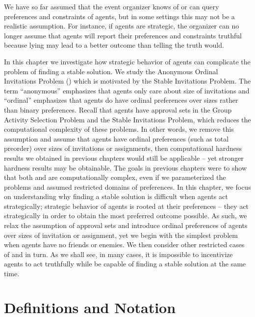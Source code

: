\label{GT:chapter}


We have so far assumed that the event organizer knows of or can query preferences and constraints of agents, but in some settings this may not be a realistic assumption. For instance, if agents are strategic, the organizer can no longer assume that agents will report their preferences and constraints truthful because lying may lead to a better outcome than telling the truth would.

In this chapter we investigate how strategic behavior of agents can complicate the problem of finding a stable solution.
We study the Anonymous Ordinal Invitations Problem (\AOIP) which is motivated by the Stable Invitations Problem. The term ``anonymous'' emphasizes that agents only care about size of invitations and ``ordinal'' emphasizes that agents do have ordinal preferences over sizes rather than binary preferences. Recall that agents have approval sets in the Group Activity Selection Problem and the Stable Invitations Problem, which reduces the computational complexity of these problems. In other words, we remove this assumption and assume that agents have ordinal preferences (such as total preorder) over sizes of invitations or assignments, then computational hardness results we obtained in previous chapters would still be applicable -- yet stronger hardness results may be obtainable. The goals in previous chapters were to show that both \GASPs and \SIPs are computationally complex, even if we parameterized the problems and assumed restricted domains of preferences. In this chapter, we focus on understanding why finding a stable solution is difficult when agents act strategically; strategic behavior of agents is rooted at their preferences -- they act strategically in order to obtain the most preferred outcome possible. As such, we relax the assumption of approval sets and introduce ordinal preferences of agents over sizes of invitation or assignment, yet we begin with the simplest problem when agents have no friends or enemies. We then consider other restricted cases of \GASPs and \SIPs in turn. As we shall see, in many cases, it is impossible to incentivize agents to act truthfully while be capable of finding a stable solution at the same time.


\section{Definitions and Notation} \label{GT:sec:prelim}


